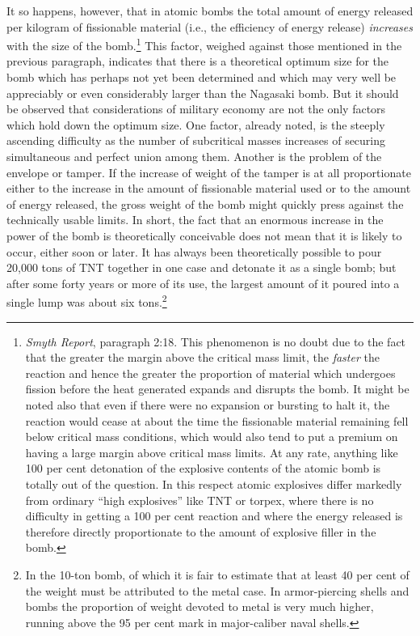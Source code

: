 It so happens, however, that in atomic bombs the total amount of energy released per kilogram of fissionable material (i.e., the efficiency of energy release) \emph{increases} with the size of the bomb.\footnote{\emph{Smyth Report}, paragraph 2:18. This phenomenon is no doubt due to the fact that the greater the margin above the critical mass limit, the \emph{faster} the reaction and hence the greater the proportion of material which undergoes fission before the heat generated expands and disrupts the bomb. It might be noted also that even if there were no expansion or bursting to halt it, the reaction would cease at about the time the fissionable material remaining fell below critical mass conditions, which would also tend to put a premium on having a large margin above critical mass limits. At any rate, anything like 100 per cent detonation of the explosive contents of the atomic bomb is totally out of the question. In this respect atomic explosives differ markedly from ordinary ``high explosives'' like TNT or torpex, where there is no difficulty in getting a 100 per cent reaction and where the energy released is therefore directly proportionate to the amount of explosive filler in the bomb.} This factor, weighed against those mentioned in the previous paragraph, indicates that there is a theoretical optimum size for the bomb which has perhaps not yet been determined and which may very well be appreciably or even considerably larger than the Nagasaki bomb. But it should be observed that considerations of military economy are not the only factors which hold down the optimum size. One factor, already noted, is the steeply ascending difficulty as the number of subcritical masses increases of securing simultaneous and perfect union among them. Another is the problem of the envelope or tamper. If the increase of weight of the tamper is at all proportionate either to the increase in the amount of fissionable material used or to the amount of energy released, the gross weight of the bomb might quickly press against the technically usable limits. In short, the fact that an enormous increase in the power of the bomb is theoretically conceivable does not mean that it is likely to occur, either soon or later. It has always been theoretically possible to pour 20,000 tons of TNT together in one case and detonate it as a single bomb; but after some forty years or more of its use, the largest amount of it poured into a single lump was about six tons.\footnote{In the 10-ton bomb, of which it is fair to estimate that at least 40 per cent of the weight must be attributed to the metal case. In armor-piercing shells and bombs the proportion of weight devoted to metal is very much higher, running above the 95 per cent mark in major-caliber naval shells.}

